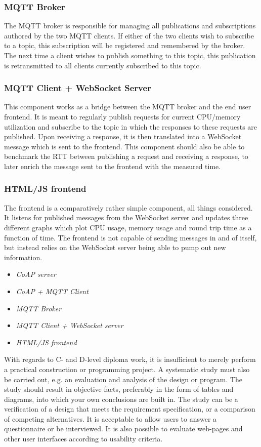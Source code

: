 \subsubsection{MQTT Broker} The MQTT broker is responsible for managing all publications and subscriptions authored by the two MQTT clients. If either of the two clients wish to subscribe to a topic, this subscription will be registered and remembered by the broker. The next time a client wishes to publish something to this topic, this publication is retransmitted to all clients currently subscribed to this topic.

\subsubsection{MQTT Client + WebSocket Server} This component works as a bridge between the MQTT broker and the end user frontend. It is meant to regularly publish requests for current CPU/memory utilization and subscribe to the topic in which the responses to these requests are published. Upon receiving a response, it is then translated into a WebSocket message which is sent to the frontend. This component should also be able to benchmark the RTT between publishing a request and receiving a response, to later enrich the message sent to the frontend with the measured time.

\subsubsection{HTML/JS frontend} The frontend is a comparatively rather simple component, all things considered. It listens for published messages from the WebSocket server and updates three different graphs which plot CPU usage, memory usage and round trip time as a function of time. The frontend is not capable of sending messages in and of itself, but instead relies on the WebSocket server being able to pump out new information.


\iffalse
\begin{itemize}
	\item \textit{CoAP server} 	
	\item \textit{CoAP + MQTT Client} 	
	\item \textit{MQTT Broker} 	
	\item \textit{MQTT Client + WebSocket server} 	
	\item \textit{HTML/JS frontend} 
\end{itemize}
With regards to C- and D-level diploma work, it is insufficient to merely perform a practical construction or programming project. A systematic study must also be carried out, e.g. an evaluation and analysis of the design or program. The study should result in objective facts, preferably in the form of tables and diagrams, into which your own conclusions are built in. The study can be a verification of a design that meets the requirement specification, or a comparison of competing alternatives. It is acceptable to allow users to answer a questionnaire or be interviewed. It is also possible to evaluate web-pages and other user interfaces according to usability criteria.

